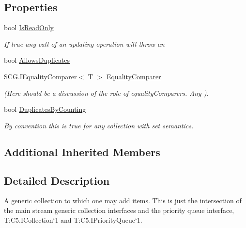 \subsection*{Properties}
\begin{DoxyCompactItemize}
\item 
bool \hyperlink{interface_c5_1_1_i_extensible_aedb0e17cd4e5d0f4a63750a5989b6706}{Is\+Read\+Only}
\begin{DoxyCompactList}\small\item\em If true any call of an updating operation will throw an \end{DoxyCompactList}\item 
bool \hyperlink{interface_c5_1_1_i_extensible_a1f2129ec206bc1a66e4a62874a67dff7}{Allows\+Duplicates}
\item 
S\+C\+G.\+I\+Equality\+Comparer$<$ T $>$ \hyperlink{interface_c5_1_1_i_extensible_a5693514400848e8b544eeffb6deed743}{Equality\+Comparer}
\begin{DoxyCompactList}\small\item\em (Here should be a discussion of the role of equality\+Comparers. Any ). \end{DoxyCompactList}\item 
bool \hyperlink{interface_c5_1_1_i_extensible_ae44a9be32f369f1363b64e2c3c682342}{Duplicates\+By\+Counting}
\begin{DoxyCompactList}\small\item\em By convention this is true for any collection with set semantics. \end{DoxyCompactList}\end{DoxyCompactItemize}
\subsection*{Additional Inherited Members}


\subsection{Detailed Description}
A generic collection to which one may add items. This is just the intersection of the main stream generic collection interfaces and the priority queue interface, T\+:\+C5.\+I\+Collection`1 and T\+:\+C5.\+I\+Priority\+Queue`1. 



